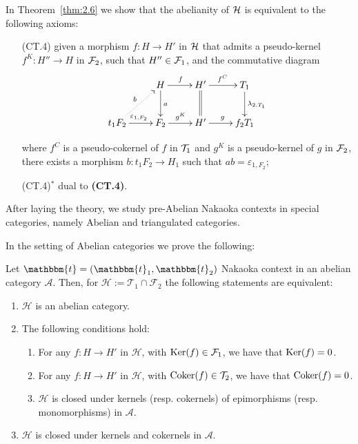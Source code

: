In Theorem~\ref{thm:2.6} we show that the abelianity of $\mathcal{H}$ is equivalent to the following axioms:
\begin{enumerate}
  \item[(CT.4)] given a morphism $f\colon H\to H'$ in $\mathcal{H}$ that admits a pseudo-kernel $f^K\colon H''\to H$ in $\mathcal{F}_2$, such that $H''\in \mathcal{F}_1$, and the commutative diagram
    \begin{equation*}
      \xymatrix{
        & H\ar[d]^{a}\ar[r]^{f} & H'\ar@{=}[d]\ar[r]^{f^C} & T_1\ar[d]^{\lambda_{2,T_1}}\\
        t_1F_2\ar@{.>}[ur]^{b}\ar[r]^{\varepsilon_{1,F_2}} & F_2\ar[r]^{g^K} & H'\ar[r]^{g} & f_2T_1
      }
    \end{equation*}
    \begin{sloppypar}
    where $f^C$  is a pseudo-cokernel of $f$ in $\mathcal{T}_1$ and $g^K$ is a pseudo-kernel of $g$ in $\mathcal{F}_2$, there exists a morphism ${b\colon t_1F_2\to H_1}$ such that $ab=\varepsilon_{1,F_2}$;
  \end{sloppypar}
  \item[(CT.4)$^\ast$] dual to \textbf{(CT.4)}.
\end{enumerate}

After laying the theory, we study pre-Abelian Nakaoka contexts in special categories, namely Abelian and triangulated categories.

In the setting of Abelian categories we prove the following:

\begin{nonlisting_thm}[\ref{thm_2_4}]
  Let $\mathbbm{t}=(\mathbbm{t}_1,\mathbbm{t}_2)$ Nakaoka context in an abelian category
  $\mathscr{A}$. Then, for
  $\mathcal{H}:=\mathcal{T}_1\cap\mathcal{F}_2$ the following statements are equivalent:
  \begin{enumerate}[label=(\alph*)]
    \item $\mathcal{H}$ is an abelian category.
    \item The following conditions hold:
      \begin{enumerate}[label=(\alph{enumi}\arabic*)]
        \item For any $f:H\to H'$ in $\mathcal{H}$, with $\operatorname{Ker}(f)\in\mathcal{F}_1$,
        we have that $\operatorname{Ker}(f)=0$.
        \item For any $f:H\to H'$ in $\mathcal{H}$, with $\operatorname{Coker}(f)\in\mathcal{T}_2$,
        we have that $\operatorname{Coker}(f)=0$.
        \item $\mathcal{H}$ is closed under kernels (resp. cokernels) of epimorphisms
        (resp. monomorphisms) in $\mathscr{A}$.
      \end{enumerate}
    \item $\mathcal{H}$ is closed under kernels and cokernels in $\mathscr{A}$.
  \end{enumerate}
\end{nonlisting_thm}

